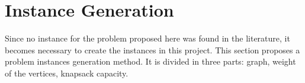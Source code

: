 \section{Instance Generation}

Since no instance for the problem proposed here was found in the literature, it becomes necessary to create the instances in this project. This section proposes a problem instances generation method. It is divided in three parts: graph, weight of the vertices, knapsack capacity.
